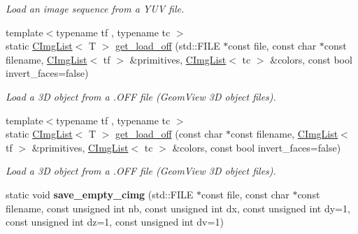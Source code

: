 \begin{DoxyCompactItemize}
\begin{DoxyCompactList}\small\item\em Load an image sequence from a Y\-U\-V file. \end{DoxyCompactList}\item 
\hypertarget{structcimg__library_1_1_c_img_list_a024bfa73da5c02dc2e6beb724e9515e9}{{\footnotesize template$<$typename tf , typename tc $>$ }\\static \hyperlink{structcimg__library_1_1_c_img_list}{C\-Img\-List}$<$ T $>$ \hyperlink{structcimg__library_1_1_c_img_list_a024bfa73da5c02dc2e6beb724e9515e9}{get\-\_\-load\-\_\-off} (std\-::\-F\-I\-L\-E $\ast$const file, const char $\ast$const filename, \hyperlink{structcimg__library_1_1_c_img_list}{C\-Img\-List}$<$ tf $>$ \&primitives, \hyperlink{structcimg__library_1_1_c_img_list}{C\-Img\-List}$<$ tc $>$ \&colors, const bool invert\-\_\-faces=false)}\label{structcimg__library_1_1_c_img_list_a024bfa73da5c02dc2e6beb724e9515e9}

\begin{DoxyCompactList}\small\item\em Load a 3\-D object from a .O\-F\-F file (Geom\-View 3\-D object files). \end{DoxyCompactList}\item 
\hypertarget{structcimg__library_1_1_c_img_list_a52d021ce4b7ec65a0803ecde7e1aff35}{{\footnotesize template$<$typename tf , typename tc $>$ }\\static \hyperlink{structcimg__library_1_1_c_img_list}{C\-Img\-List}$<$ T $>$ \hyperlink{structcimg__library_1_1_c_img_list_a52d021ce4b7ec65a0803ecde7e1aff35}{get\-\_\-load\-\_\-off} (const char $\ast$const filename, \hyperlink{structcimg__library_1_1_c_img_list}{C\-Img\-List}$<$ tf $>$ \&primitives, \hyperlink{structcimg__library_1_1_c_img_list}{C\-Img\-List}$<$ tc $>$ \&colors, const bool invert\-\_\-faces=false)}\label{structcimg__library_1_1_c_img_list_a52d021ce4b7ec65a0803ecde7e1aff35}

\begin{DoxyCompactList}\small\item\em Load a 3\-D object from a .O\-F\-F file (Geom\-View 3\-D object files). \end{DoxyCompactList}\item 
\hypertarget{structcimg__library_1_1_c_img_list_afec329b1d9ae33d27fbb00820889d54a}{static void {\bfseries save\-\_\-empty\-\_\-cimg} (std\-::\-F\-I\-L\-E $\ast$const file, const char $\ast$const filename, const unsigned int nb, const unsigned int dx, const unsigned int dy=1, const unsigned int dz=1, const unsigned int dv=1)}\label{structcimg__library_1_1_c_img_list_afec329b1d9ae33d27fbb00820889d54a}


\end{DoxyCompactItemize}
